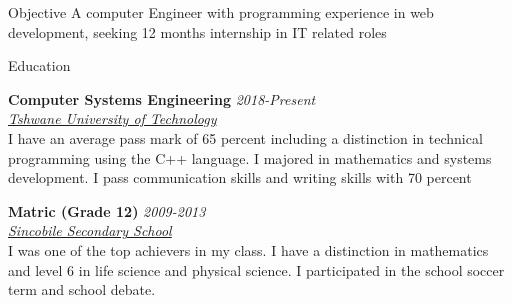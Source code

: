 \documentclass{resume} %
\newcommand{\sepspace}{\vspace*{1em}}           %
\newcommand{\EducationEntry}[4]{
        \noindent \textbf{#1} \hfill \textit{#2} \\     %
        \noindent \textit{#3} \\        %
        \noindent  #4  %
        \normalsize \par}
\begin{document}
\begin{rSection}{Objective}
{A computer Engineer with programming experience in web development, seeking 12 months internship in IT related roles}
\end{rSection}
\begin{rSection}{Education}
        \EducationEntry{Computer Systems Engineering}{2018-Present}
        {\href{https://www.tut.ac.za/} {Tshwane University of Technology}}
        {I have an average pass mark of 65 percent including a distinction in technical programming using the C++ language. I majored in mathematics and systems  development. I pass communication skills and writing skills with 70 percent}

        \EducationEntry{Matric (Grade 12)}{2009-2013}
        {\href{https://sincobilesecondaryschool.co.za/}{Sincobile Secondary School}}
        {I was one of the top achievers in my class. I have a distinction in mathematics and level 6 in life science and physical science. I participated in the school soccer term and school debate.}
\end{rSection}
\end{document}
